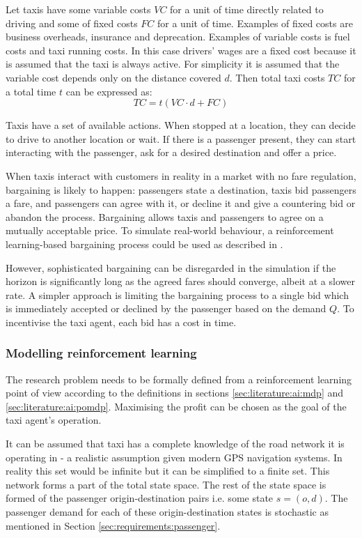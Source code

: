 Let taxis have some variable costs \(VC\) for a unit of time directly related
to driving and some of fixed costs \(FC\) for a unit of time. Examples of fixed
costs are business overheads, insurance and deprecation. Examples of variable
costs is fuel costs and taxi running costs. In this case drivers' wages are a
fixed cost because it is assumed that the taxi is always active. For simplicity
it is assumed that the variable cost depends only on the distance covered
\(d\). Then total taxi costs \(TC\) for a total time \(t\) can be expressed as:
\[ TC = t(VC\cdot d + FC) \]

Taxis have a set of available actions. When stopped at a location, they can
decide to drive to another location or wait. If there is a passenger present,
they can start interacting with the passenger, ask for a desired destination
and offer a price.

When taxis interact with customers in reality in a market with no fare
regulation, bargaining is likely to happen: passengers state a destination,
taxis bid passengers a fare, and passengers can agree with it, or decline it
and give a countering bid or abandon the process. Bargaining allows taxis and
passengers to agree on a mutually acceptable price. To simulate real-world
behaviour, a reinforcement learning-based bargaining process could be used as
described in \textcite{Cli1997taxi+bargaining}.

However, sophisticated bargaining can be disregarded in the simulation if the
horizon is significantly long as the agreed fares should converge, albeit at a
slower rate. A simpler approach is limiting the bargaining process to a single
bid which is immediately accepted or declined by the passenger based on the
demand \(Q\). To incentivise the taxi agent, each bid has a cost in time.


\subsubsection{Modelling reinforcement learning}
\label{sec:requirements:ai}

The research problem needs to be formally defined from a reinforcement learning
point of view according to the definitions in sections
\ref{sec:literature:ai:mdp} and \ref{sec:literature:ai:pomdp}. Maximising the
profit can be chosen as the goal of the taxi agent's operation.

It can be assumed that taxi has a complete knowledge of the road network it is
operating in - a realistic assumption given modern GPS navigation systems. In
reality this set would be infinite but it can be simplified to a finite set.
This network forms a part of the total state space. The rest of the state space
is formed of the passenger origin-destination pairs i.e. some state \(s = (o,
d) \). The passenger demand for each of these origin-destination states is
stochastic as mentioned in Section \ref{sec:requirements:passenger}. 


